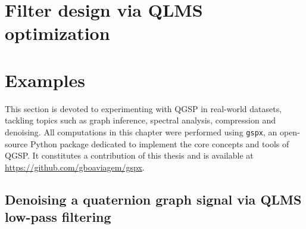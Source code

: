 

\section{Filter design via QLMS optimization}

\section{Examples}

This section is devoted to experimenting with QGSP in real-world datasets, tackling topics such as graph inference, spectral analysis, compression and denoising. All computations in this chapter were performed using \texttt{gspx}, an open-source Python package dedicated to implement the core concepts and tools of QGSP. It constitutes a contribution of this thesis and is available at \url{https://github.com/gboaviagem/gspx}.

\subsection{Denoising a quaternion graph signal via QLMS low-pass filtering}

